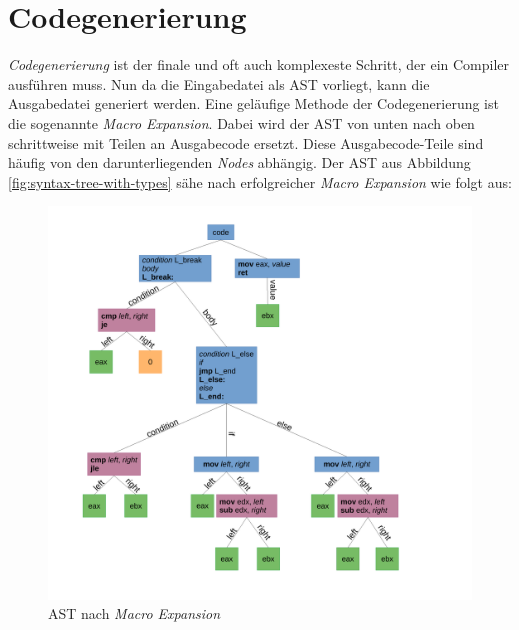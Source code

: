 \section{Codegenerierung} \label{sec:traditional_code_generation}
\textit{Codegenerierung} ist der finale und oft auch komplexeste Schritt, der ein Compiler ausführen muss.
Nun da die Eingabedatei als AST vorliegt, kann die Ausgabedatei generiert werden. Eine geläufige Methode der Codegenerierung ist die sogenannte \textit{Macro Expansion}.
Dabei wird der AST von unten nach oben schrittweise mit Teilen an Ausgabecode ersetzt.
Diese Ausgabecode-Teile sind häufig von den darunterliegenden \textit{Nodes} abhängig. Der AST aus Abbildung \ref{fig:syntax-tree-with-types} sähe nach erfolgreicher \textit{Macro Expansion} wie folgt aus:

\begin{figure}[H]
    \centering
    \includegraphics[scale=0.4]{resources/images/AST_macro_expansion.pdf}
    \caption[AST nach \textit{Macro Expansion}. (Basierend auf Abbildung \ref{fig:syntax-tree})]{AST nach \textit{Macro Expansion}}
    \label{fig:syntax-tree-after-macro-expansion}
\end{figure}

